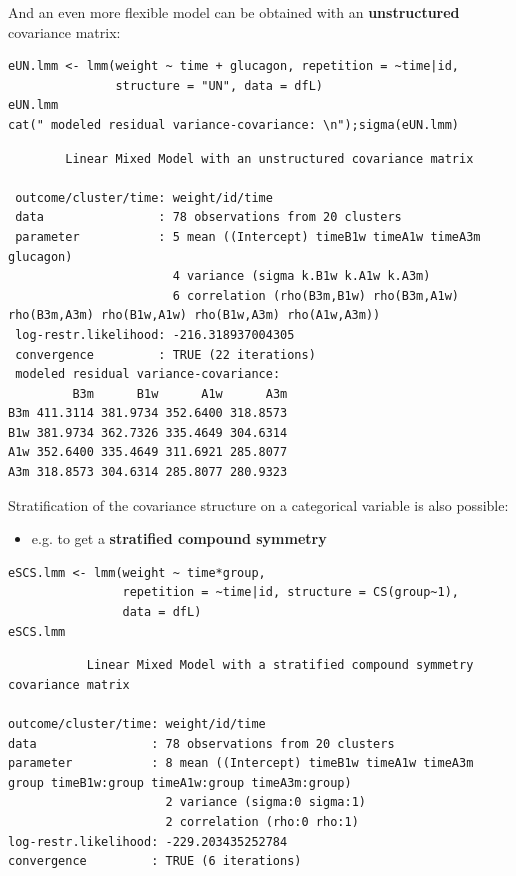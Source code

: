 \documentclass[12pt]{article}
\begin{document}
\clearpage

\noindent And an even more flexible model can be obtained with an
\textbf{unstructured} covariance matrix:

\lstset{language=r,label= ,caption= ,captionpos=b,numbers=none}
\begin{lstlisting}
eUN.lmm <- lmm(weight ~ time + glucagon, repetition = ~time|id,
               structure = "UN", data = dfL)
eUN.lmm
cat(" modeled residual variance-covariance: \n");sigma(eUN.lmm)
\end{lstlisting}

\begin{verbatim}
		Linear Mixed Model with an unstructured covariance matrix 

 outcome/cluster/time: weight/id/time 
 data                : 78 observations from 20 clusters 
 parameter           : 5 mean ((Intercept) timeB1w timeA1w timeA3m glucagon) 
                       4 variance (sigma k.B1w k.A1w k.A3m) 
                       6 correlation (rho(B3m,B1w) rho(B3m,A1w) rho(B3m,A3m) rho(B1w,A1w) rho(B1w,A3m) rho(A1w,A3m)) 
 log-restr.likelihood: -216.318937004305 
 convergence         : TRUE (22 iterations)
 modeled residual variance-covariance: 
         B3m      B1w      A1w      A3m
B3m 411.3114 381.9734 352.6400 318.8573
B1w 381.9734 362.7326 335.4649 304.6314
A1w 352.6400 335.4649 311.6921 285.8077
A3m 318.8573 304.6314 285.8077 280.9323
\end{verbatim}

\noindent Stratification of the covariance structure on a categorical
variable is also possible:
\begin{itemize}
\item e.g. to get a \textbf{stratified compound symmetry}
\end{itemize}
\lstset{language=r,label= ,caption= ,captionpos=b,numbers=none}
\begin{lstlisting}
eSCS.lmm <- lmm(weight ~ time*group,
                repetition = ~time|id, structure = CS(group~1),
                data = dfL)
eSCS.lmm
\end{lstlisting}

\begin{verbatim}
	       Linear Mixed Model with a stratified compound symmetry covariance matrix 

outcome/cluster/time: weight/id/time 
data                : 78 observations from 20 clusters 
parameter           : 8 mean ((Intercept) timeB1w timeA1w timeA3m group timeB1w:group timeA1w:group timeA3m:group) 
                      2 variance (sigma:0 sigma:1) 
                      2 correlation (rho:0 rho:1) 
log-restr.likelihood: -229.203435252784 
convergence         : TRUE (6 iterations)
\end{verbatim}
\end{document}
